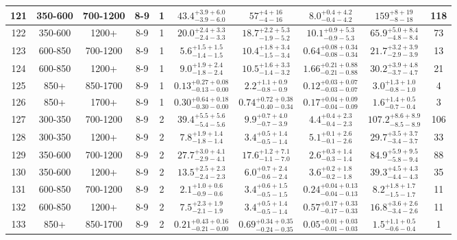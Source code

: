 \documentclass[11pt, oneside]{article}
\begin{document}
\begin{table}
{\begin{tabular}{ |c|c|c|c|c||c|c|c||c|c| }
121 & 350-600 & 700-1200 & 8-9 & 1 & $43.4^{+3.9+6.0}_{-3.9-6.0}$ & $57^{+ 4+16}_{- 4-16}$ & $8.0^{+0.4+4.2}_{-0.4-4.2}$ & $159^{+ 8+19}_{- 8-18}$ & 118 \\ \hline
122 & 350-600 & 1200+ & 8-9 & 1 & $20.0^{+2.4+3.3}_{-2.4-3.3}$ & $18.7^{+2.2+5.3}_{-1.9-5.2}$ & $10.1^{+0.9+5.3}_{-0.9-5.3}$ & $65.9^{+5.0+8.4}_{-4.8-8.4}$ & 73 \\ \hline
123 & 600-850 & 700-1200 & 8-9 & 1 & $5.6^{+1.5+1.5}_{-1.4-1.5}$ & $10.4^{+1.8+3.4}_{-1.5-3.4}$ & $0.64^{+0.08+0.34}_{-0.08-0.34}$ & $21.7^{+3.2+3.9}_{-2.9-3.9}$ & 13 \\ \hline
124 & 600-850 & 1200+ & 8-9 & 1 & $9.0^{+1.9+2.4}_{-1.8-2.4}$ & $10.5^{+1.6+3.3}_{-1.4-3.2}$ & $1.66^{+0.21+0.88}_{-0.21-0.88}$ & $30.2^{+3.9+4.8}_{-3.7-4.7}$ & 21 \\ \hline
125 & 850+ & 850-1700 & 8-9 & 1 & $0.13^{+0.27+0.08}_{-0.13-0.00}$ & $2.2^{+1.1+0.9}_{-0.8-0.9}$ & $0.12^{+0.03+0.07}_{-0.03-0.07}$ & $3.0^{+1.3+1.0}_{-0.8-1.0}$ & 4 \\ \hline
126 & 850+ & 1700+ & 8-9 & 1 & $0.30^{+0.64+0.18}_{-0.30-0.00}$ & $0.74^{+0.72+0.38}_{-0.40-0.34}$ & $0.17^{+0.04+0.09}_{-0.04-0.09}$ & $1.6^{+1.4+0.5}_{-0.7-0.4}$ & 3 \\ \hline
127 & 300-350 & 700-1200 & 8-9 & 2 & $39.4^{+5.5+5.6}_{-5.4-5.6}$ & $9.9^{+0.7+4.0}_{-0.7-3.9}$ & $4.4^{+0.4+2.3}_{-0.4-2.3}$ & $107.2^{+8.6+8.9}_{-8.5-8.9}$ & 106 \\ \hline
128 & 300-350 & 1200+ & 8-9 & 2 & $7.8^{+1.9+1.4}_{-1.8-1.4}$ & $3.4^{+0.5+1.4}_{-0.5-1.4}$ & $5.1^{+0.1+2.6}_{-0.1-2.6}$ & $29.7^{+3.5+3.7}_{-3.4-3.7}$ & 33 \\ \hline
129 & 350-600 & 700-1200 & 8-9 & 2 & $27.7^{+3.0+4.1}_{-2.9-4.1}$ & $17.6^{+1.2+7.1}_{-1.1-7.0}$ & $2.6^{+0.3+1.4}_{-0.3-1.4}$ & $84.9^{+5.9+9.5}_{-5.8-9.4}$ & 88 \\ \hline
130 & 350-600 & 1200+ & 8-9 & 2 & $13.5^{+2.5+2.3}_{-2.4-2.3}$ & $6.0^{+0.7+2.4}_{-0.6-2.4}$ & $3.6^{+0.2+1.8}_{-0.2-1.8}$ & $39.3^{+4.5+4.3}_{-4.4-4.3}$ & 35 \\ \hline
131 & 600-850 & 700-1200 & 8-9 & 2 & $2.1^{+1.0+0.6}_{-0.9-0.6}$ & $3.4^{+0.6+1.5}_{-0.5-1.5}$ & $0.24^{+0.04+0.13}_{-0.04-0.13}$ & $8.2^{+1.8+1.7}_{-1.5-1.7}$ & 11 \\ \hline
132 & 600-850 & 1200+ & 8-9 & 2 & $7.5^{+2.3+1.9}_{-2.1-1.9}$ & $3.4^{+0.5+1.4}_{-0.5-1.4}$ & $0.57^{+0.17+0.33}_{-0.17-0.33}$ & $16.8^{+3.6+2.6}_{-3.4-2.6}$ & 11 \\ \hline
133 & 850+ & 850-1700 & 8-9 & 2 & $0.21^{+0.43+0.16}_{-0.21-0.00}$ & $0.69^{+0.34+0.35}_{-0.24-0.35}$ & $0.05^{+0.01+0.03}_{-0.01-0.03}$ & $1.5^{+1.1+0.5}_{-0.6-0.4}$ & 1 \\ \hline

\end{tabular}}
\end{table}
\end{document}
